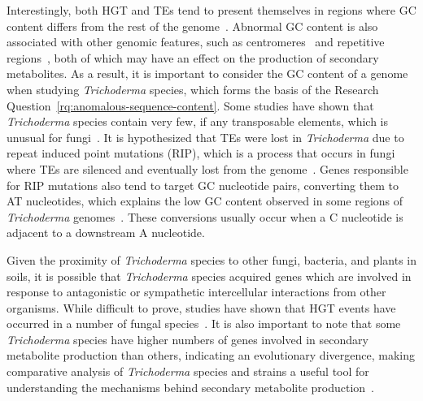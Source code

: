 Interestingly, both HGT and TEs tend to present themselves in regions
where GC content differs from the rest of the
genome~\cite{goncalves2024}. Abnormal GC content is also associated
with other genomic features, such as centromeres~\cite{plohl2014a} and
repetitive regions~\cite{winter2018}, both of which may have an effect
on the production of secondary metabolites. As a result, it is
important to consider the GC content of a genome when
studying \textit{Trichoderma} species, which forms the basis of the
Research Question~\ref{rq:anomalous-sequence-content}. Some studies
have shown that \textit{Trichoderma} species contain very few, if any
transposable elements, which is unusual for
fungi~\cite{kubicek2011}. It is hypothesized that TEs were lost
in \textit{Trichoderma} due to repeat induced point mutations (RIP),
which is a process that occurs in fungi where TEs are silenced and
eventually lost from the genome~\cite{kubicek2011}. Genes responsible
for RIP mutations also tend to target GC nucleotide pairs, converting
them to AT nucleotides, which explains the low GC content observed in
some regions of \textit{Trichoderma}
genomes~\cite{goncalves2024}. These conversions usually occur when a C
nucleotide is adjacent to a downstream A nucleotide.


Given the proximity of \textit{Trichoderma} species to other fungi,
bacteria, and plants in soils, it is possible
that \textit{Trichoderma} species acquired genes which are involved in
response to antagonistic or sympathetic intercellular interactions
from other organisms. While difficult to prove, studies have shown
that HGT events have occurred in a number of fungal
species~\cite{fitzpatrick2012}. It is also important to note that
some \textit{Trichoderma} species have higher numbers of genes
involved in secondary metabolite production than others, indicating an
evolutionary divergence, making comparative analysis
of \textit{Trichoderma} species and strains a useful tool for
understanding the mechanisms behind secondary metabolite
production~\cite{Mukherjee2012}.

